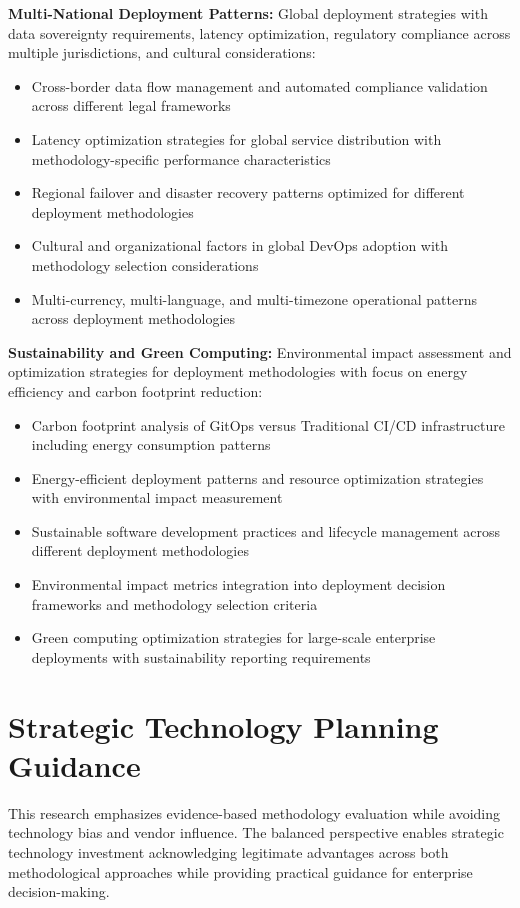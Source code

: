 \textbf{Multi-National Deployment Patterns:} Global deployment strategies with data sovereignty requirements, latency optimization, regulatory compliance across multiple jurisdictions, and cultural considerations:
\begin{itemize}
\item Cross-border data flow management and automated compliance validation across different legal frameworks
\item Latency optimization strategies for global service distribution with methodology-specific performance characteristics
\item Regional failover and disaster recovery patterns optimized for different deployment methodologies
\item Cultural and organizational factors in global DevOps adoption with methodology selection considerations
\item Multi-currency, multi-language, and multi-timezone operational patterns across deployment methodologies
\end{itemize}

\textbf{Sustainability and Green Computing:} Environmental impact assessment and optimization strategies for deployment methodologies with focus on energy efficiency and carbon footprint reduction:
\begin{itemize}
\item Carbon footprint analysis of GitOps versus Traditional CI/CD infrastructure including energy consumption patterns
\item Energy-efficient deployment patterns and resource optimization strategies with environmental impact measurement
\item Sustainable software development practices and lifecycle management across different deployment methodologies
\item Environmental impact metrics integration into deployment decision frameworks and methodology selection criteria
\item Green computing optimization strategies for large-scale enterprise deployments with sustainability reporting requirements
\end{itemize}

\section{Strategic Technology Planning Guidance}
\label{sec:strategic_guidance}

This research emphasizes evidence-based methodology evaluation while avoiding technology bias and vendor influence. The balanced perspective enables strategic technology investment acknowledging legitimate advantages across both methodological approaches while providing practical guidance for enterprise decision-making.

